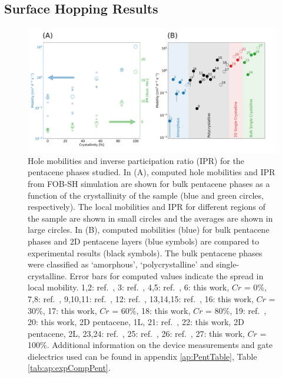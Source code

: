 \subsection{Surface Hopping Results}
\begin{figure}[htp] 
  \includegraphics[width=\textwidth]{./img/DifferentQuenchTimes/mobilities.png}
  \caption{\label{fig:mobilities}Hole mobilities and inverse participation ratio (IPR) for the pentacene phases studied.  
 In (A), computed hole mobilities and IPR from FOB-SH simulation are shown for bulk pentacene phases 
 as a function of the crystallinity of the sample (blue and green circles, respectively). The local mobilities and IPR for different regions of the sample are shown in 
 small circles and the averages are shown in large circles. In (B), computed mobilities (blue) for bulk pentacene phases and 2D pentacene layers (blue symbols) 
 are compared to experimental results (black symbols). The bulk pentacene phases were classified as `amorphous', `polycrystalline' and single-crystalline. 
 Error bars for computed values indicate the spread in local mobility.  
 1,2: ref.~\cite{AmorphPentPumpProbe}, 
 3: ref.~\cite{BAE201398}, 
 4,5: ref.~\cite{AmorphPentTransportDodgy},
 6: this work, $Cr$ = 0\%,
 7,8: ref.~\cite{KNIPP2004595},
 9,10,11: ref.~\cite{Fritz2005},
 12: ref.~\cite{Duffy2008}, 
 13,14,15: ref.~\cite{Klauk02},
 16: this work, $Cr$ = 30\%,
 17: this work, $Cr$ = 60\%,
 18:  this work,  $Cr$ = 80\%,
 19: ref.~\cite{Zhang2016TF},
  20: this work, 2D pentacene, 1L,
 21: ref.~\cite{Zhang2016TF},
 22:  this work, 2D pentacene, 2L,
 23,24: ref.~\cite{Lee2006}, 
 25: ref.~\cite{Takeyama2012_PentCryst},
 26: ref.~\cite{Arabi2016},
 27: this work, $Cr$ = 100\%.  
	Additional information on the device measurements and gate dielectrics used can be found in appendix \ref{ap:PentTable}, Table \ref{tab:ap:expCompPent}.}
\end{figure}
